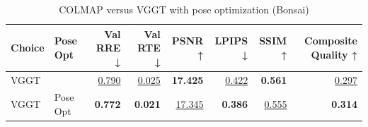 \begin{table}[H]
\caption{COLMAP versus VGGT with pose optimization (Bonsai)}
\label{tab:04_pose_opt_bonsai}
\begin{tabular}{llrrrrrr}
\toprule
Choice & Pose Opt & Val RRE ↓ & Val RTE ↓ & PSNR ↑ & LPIPS ↓ & SSIM ↑ & Composite Quality ↑ \\
\midrule
VGGT &  & \underline{0.790} & \underline{0.025} & \textbf{17.425} & \underline{0.422} & \textbf{0.561} & \underline{0.297} \\
VGGT & Pose Opt & \textbf{0.772} & \textbf{0.021} & \underline{17.345} & \textbf{0.386} & \underline{0.555} & \textbf{0.314} \\
\bottomrule
\end{tabular}
\end{table}
